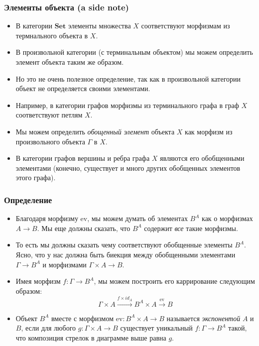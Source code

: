 \documentclass{beamer}
\theoremstyle{definition}
\newcommand{\cat}[1]{\mathbf{#1}}
\newcommand{\Set}{\cat{Set}}
\newcommand{\ev}{\mathrm{ev}}
\begin{document}
\begin{frame}
\frametitle{Элементы объекта (a side note)}
\begin{itemize}
\item В категории $\Set$ элементы множества $X$ соответствуют морфизмам из термнального объекта в $X$.
\item В произвольной категории (с терминальным объектом) мы можем определить элемент объекта таким же образом.
\item Но это не очень полезное определение, так как в произвольной категории объект не определяется своими элементами.
\item Например, в категории графов морфизмы из терминального графа в граф $X$ соответствуют петлям $X$.
\item Мы можем определить \emph{обощенный элемент} объекта $X$ как морфизм из произвольного объекта $\Gamma$ в $X$.
\item В категории графов вершины и ребра графа $X$ являются его обобщенными элементами (конечно, существует и много других обобщенных элементов этого графа).
\end{itemize}
\end{frame}

\begin{frame}
\frametitle{Определение}
\begin{itemize}
\item Благодаря морфизму $\ev$, мы можем думать об элементах $B^A$ как о морфизмах $A \to B$.
Мы еще должны сказать, что $B^A$ содержит \emph{все} такие морфизмы.
\item То есть мы должны сказать чему соответствуют обобщенные элементы $B^A$.
Ясно, что у нас должна быть биекция между обобщенными элементами $\Gamma \to B^A$ и морфизмами $\Gamma \times A \to B$.
\item Имея морфизм $f : \Gamma \to B^A$, мы можем построить его каррирование следующим образом:
\[ \Gamma \times A \xrightarrow{f \times id_A} B^A \times A \xrightarrow{\ev} B\]
\item Объект $B^A$ вместе с морфизмом $\ev : B^A \times A \to B$ называется \emph{экспонентой} $A$ и $B$,
если для любого $g : \Gamma \times A \to B$ существует уникальный $f : \Gamma \to B^A$ такой, что композиция стрелок в диаграмме выше равна $g$.
\end{itemize}
\end{frame}
\end{document}
